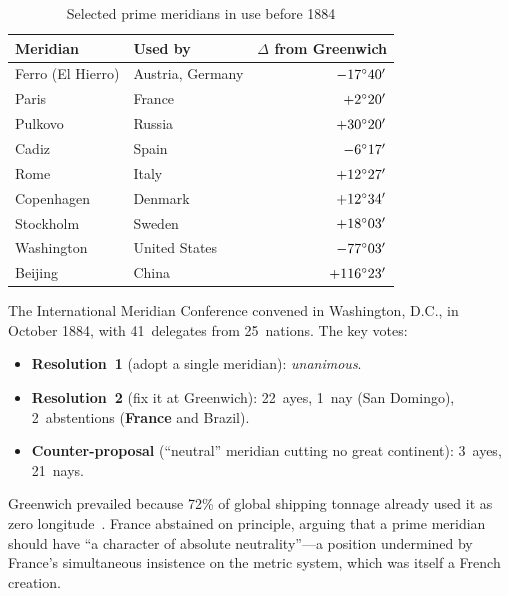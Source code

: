 \documentclass[10pt,a4paper]{article}
\begin{document}
\begin{table}[H]
\centering
\caption{Selected prime meridians in use before 1884}
\label{tab:meridians}
\small
\begin{tabular}{@{}llr@{}}
\toprule
\textbf{Meridian} & \textbf{Used by} & \textbf{$\Delta$ from Greenwich} \\
\midrule
Ferro (El Hierro)  & Austria, Germany       & $-17\degree 40'$ \\
Paris              & France                 & $+2\degree 20'$ \\
Pulkovo            & Russia                 & $+30\degree 20'$ \\
Cadiz              & Spain                  & $-6\degree 17'$ \\
Rome               & Italy                  & $+12\degree 27'$ \\
Copenhagen         & Denmark                & $+12\degree 34'$ \\
Stockholm          & Sweden                 & $+18\degree 03'$ \\
Washington         & United States          & $-77\degree 03'$ \\
Beijing            & China                  & $+116\degree 23'$ \\
\bottomrule
\end{tabular}
\end{table}

The International Meridian Conference convened in Washington, D.C., in October
1884, with 41~delegates from 25~nations. The key votes:

\begin{itemize}[nosep]
  \item \textbf{Resolution~1} (adopt a single meridian): \emph{unanimous}.
  \item \textbf{Resolution~2} (fix it at Greenwich): 22~ayes, 1~nay
    (San Domingo), 2~abstentions (\textbf{France} and Brazil).
  \item \textbf{Counter-proposal} (``neutral'' meridian cutting no great
    continent): 3~ayes, 21~nays.
\end{itemize}

\noindent
Greenwich prevailed because 72\% of global shipping tonnage already used it
as zero longitude~\cite{howse1997}. France abstained on principle, arguing that a prime
meridian should have ``a character of absolute neutrality''---a position
undermined by France's simultaneous insistence on the metric system, which
was itself a French creation.
\end{document}
